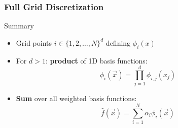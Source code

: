 \begin{frame}
  \frametitle{Full Grid Discretization}
  \topline
  \vspace{-10px}
  \begin{block}{Summary}
    \begin{itemize}
      \item Grid points $i \in \{1,2,\dots,N\}^d$ defining $\phi_i(x)$
        \vspace{5px}
        \item For $d > 1$: \textbf{product} of 1D basis functions: \\
          $$\phi_i(\vec{x}) = \prod_{j=1}^d{\phi_{i,j}(x_j)}$$
        \item \textbf{Sum} over all weighted basis functions: \\
          $$\hat{f}(\vec{x}) = \sum_{i=1}^N{\alpha_i \phi_i(\vec{x})}$$
    \end{itemize}

  \end{block}
\end{frame}


